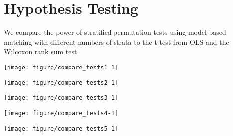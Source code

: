 \documentclass[11pt]{article}\usepackage[]{graphicx}\usepackage[]{color}
\makeatletter
\def\maxwidth{ %
  \ifdim\Gin@nat@width>\linewidth
    \linewidth
  \else
    \Gin@nat@width
  \fi
}
\newenvironment{knitrout}{}{} %
\makeatother
\begin{document}
\section{Hypothesis Testing}
We compare the power of stratified permutation tests using model-based matching with different numbers of strata to the t-test from OLS and the Wilcoxon rank sum test.




\begin{knitrout}
\color{fgcolor}

{\centering \texttt{[image: figure/compare\_tests1-1]} 

}



\end{knitrout}

\begin{knitrout}
\color{fgcolor}

{\centering \texttt{[image: figure/compare\_tests2-1]} 

}



\end{knitrout}

\begin{knitrout}
\color{fgcolor}

{\centering \texttt{[image: figure/compare\_tests3-1]} 

}



\end{knitrout}

\begin{knitrout}
\color{fgcolor}

{\centering \texttt{[image: figure/compare\_tests4-1]} 

}



\end{knitrout}

\begin{knitrout}
\color{fgcolor}

{\centering \texttt{[image: figure/compare\_tests5-1]} 

}



\end{knitrout}
\end{document}
